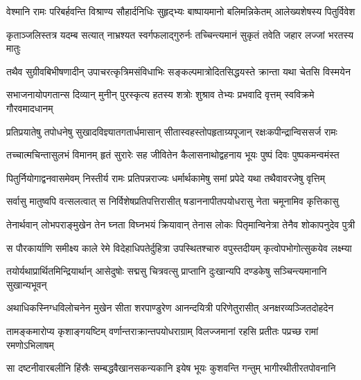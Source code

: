 \fourlineindentedshloka
{वेश्मानि रामः परिबर्हवन्ति}
{विश्राण्य सौहार्दनिधिः सुहृद्भ्यः}
{बाष्पायमानो बलिमन्निकेतम्}
{आलेख्यशेषस्य पितुर्विवेश} %

\fourlineindentedshloka
{कृताञ्जलिस्तत्र यदम्ब सत्यात्}
{नाभ्रश्यत स्वर्गफलाद्गुरुर्नः}
{तच्चिन्त्यमानं सुकृतं तवेति}
{जहार लज्जां भरतस्य मातुः} %

\fourlineindentedshloka
{तथैव सुग्रीवबिभीषणादीन्}
{उपाचरत्कृत्रिमसंविधाभिः}
{सङ्कल्पमात्रोदितसिद्धयस्ते}
{क्रान्ता यथा चेतसि विस्मयेन} %

\fourlineindentedshloka
{सभाजनायोपगतान्स दिव्यान्}
{मुनीन् पुरस्कृत्य हतस्य शत्रोः}
{शुश्राव तेभ्यः प्रभवादि वृत्तम्}
{स्वविक्रमे गौरवमादधानम्} %

\fourlineindentedshloka
{प्रतिप्रयातेषु तपोधनेषु}
{सुखादविज्ञ्यातगतार्धमासान्}
{सीतास्वहस्तोपहृताग्र्यपूजान्}
{रक्षःकपीन्द्रान्विससर्ज रामः} %

\fourlineindentedshloka
{तच्चात्मचिन्तासुलभं विमानम्}
{हृतं सुरारेः सह जीवितेन}
{कैलासनाथोद्वहनाय भूयः}
{पुष्पं दिवः पुष्पकमन्वमंस्त} %

\fourlineindentedshloka
{पितुर्नियोगाद्वनवासमेवम्}
{निस्तीर्य रामः प्रतिपन्नराज्यः}
{धर्मार्थकामेषु समां प्रपेदे}
{यथा तथैवावरजेषु वृत्तिम्} %

\fourlineindentedshloka
{सर्वासु मातुष्वपि वत्सलत्वात्}
{स निर्विशेषप्रतिपत्तिरासीत्}
{षडाननापीतपयोधरासु}
{नेता चमूनामिव कृत्तिकासु} %

\fourlineindentedshloka
{तेनार्थवान् लोभपराङ्मुखेन}
{तेन घ्नता विघ्नभयं क्रियावान्}
{तेनास लोकः पितृमान्विनेत्रा}
{तेनैव शोकापनुदेव पुत्री} %

\fourlineindentedshloka
{स पौरकार्याणि समीक्ष्य काले}
{रेमे विदेहाधिपतेर्दुहित्रा}
{उपस्थितश्चारु वपुस्तदीयम्}
{कृत्वोपभोगोत्सुकयेव लक्ष्म्या} %

\fourlineindentedshloka
{तयोर्यथाप्रार्थितमिन्द्रियार्थान्}
{आसेदुषोः सद्मसु चित्रवत्सु}
{प्राप्तानि दुःखान्यपि दण्डकेषु}
{सञ्चिन्त्यमानानि सुखान्यभूवन्} %

\fourlineindentedshloka
{अथाधिकस्निग्धविलोचनेन}
{मुखेन सीता शरपाण्डुरेण}
{आनन्दयित्री परिणेतुरासीत्}
{अनक्षरव्यञ्जितदोहदेन} %

\fourlineindentedshloka
{तामङ्कमारोप्य कृशाङ्गयष्टिम्}
{वर्णान्तराक्रान्तपयोधराग्राम्}
{विलज्जमानां रहसि प्रतीतः}
{पप्रच्छ रामां रमणोऽभिलाषम्} %

\fourlineindentedshloka
{सा दष्टनीवारबलीनि हिंस्रैः}
{सम्बद्धवैखानसकन्यकानि}
{इयेष भूयः कुशवन्ति गन्तुम्}
{भागीरथीतीरतपोवनानि} %

